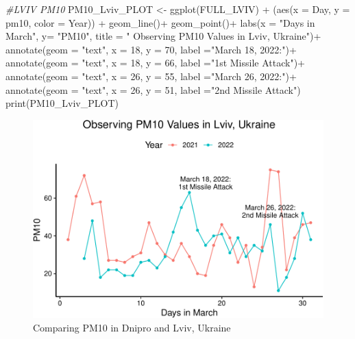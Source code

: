 \documentclass[
  12pt,
]{article}
\newenvironment{Shaded}{\begin{snugshade}}{\end{snugshade}}
\newcommand{\AttributeTok}[1]{\textcolor[rgb]{0.77,0.63,0.00}{#1}}
\newcommand{\CommentTok}[1]{\textcolor[rgb]{0.56,0.35,0.01}{\textit{#1}}}
\newcommand{\DecValTok}[1]{\textcolor[rgb]{0.00,0.00,0.81}{#1}}
\newcommand{\FunctionTok}[1]{\textcolor[rgb]{0.00,0.00,0.00}{#1}}
\newcommand{\NormalTok}[1]{#1}
\newcommand{\OtherTok}[1]{\textcolor[rgb]{0.56,0.35,0.01}{#1}}
\newcommand{\SpecialCharTok}[1]{\textcolor[rgb]{0.00,0.00,0.00}{#1}}
\newcommand{\StringTok}[1]{\textcolor[rgb]{0.31,0.60,0.02}{#1}}
\begin{document}
\begin{Shaded}
\begin{Highlighting}[]
\CommentTok{\#LVIV PM10}
\NormalTok{PM10\_Lviv\_PLOT }\OtherTok{\textless{}{-}} \FunctionTok{ggplot}\NormalTok{(FULL\_LVIV) }\SpecialCharTok{+} 
\NormalTok{  (}\FunctionTok{aes}\NormalTok{(}\AttributeTok{x =}\NormalTok{ Day, }\AttributeTok{y =}\NormalTok{ pm10, }\AttributeTok{color =}\NormalTok{ Year)) }\SpecialCharTok{+} 
  \FunctionTok{geom\_line}\NormalTok{()}\SpecialCharTok{+}  
  \FunctionTok{geom\_point}\NormalTok{()}\SpecialCharTok{+}
  \FunctionTok{labs}\NormalTok{(}\AttributeTok{x =} \StringTok{"Days in March"}\NormalTok{, }\AttributeTok{y=} \StringTok{"PM10"}\NormalTok{,}
  \AttributeTok{title =} \StringTok{"         Observing PM10 Values in Lviv, Ukraine"}\NormalTok{)}\SpecialCharTok{+}    
  \FunctionTok{annotate}\NormalTok{(}\AttributeTok{geom =} \StringTok{"text"}\NormalTok{, }\AttributeTok{x =} \DecValTok{18}\NormalTok{, }\AttributeTok{y =} \DecValTok{70}\NormalTok{, }\AttributeTok{label =}\StringTok{"March 18, 2022:"}\NormalTok{)}\SpecialCharTok{+} 
  \FunctionTok{annotate}\NormalTok{(}\AttributeTok{geom =} \StringTok{"text"}\NormalTok{, }\AttributeTok{x =} \DecValTok{18}\NormalTok{, }\AttributeTok{y =} \DecValTok{66}\NormalTok{, }\AttributeTok{label =}\StringTok{"1st Missile Attack"}\NormalTok{)}\SpecialCharTok{+} 
  \FunctionTok{annotate}\NormalTok{(}\AttributeTok{geom =} \StringTok{"text"}\NormalTok{, }\AttributeTok{x =} \DecValTok{26}\NormalTok{, }\AttributeTok{y =} \DecValTok{55}\NormalTok{, }\AttributeTok{label =}\StringTok{"March 26, 2022:"}\NormalTok{)}\SpecialCharTok{+} 
  \FunctionTok{annotate}\NormalTok{(}\AttributeTok{geom =} \StringTok{"text"}\NormalTok{, }\AttributeTok{x =} \DecValTok{26}\NormalTok{, }\AttributeTok{y =} \DecValTok{51}\NormalTok{, }\AttributeTok{label =}\StringTok{"2nd Missile Attack"}\NormalTok{)}
\FunctionTok{print}\NormalTok{(PM10\_Lviv\_PLOT)}
\end{Highlighting}
\end{Shaded}

\begin{figure}
\centering
\includegraphics{Fontanie_Gordon_Weinberg_Project_files/figure-latex/Plotting PM10-2.pdf}
\caption{Comparing PM10 in Dnipro and Lviv, Ukraine}
\end{figure}
\end{document}
